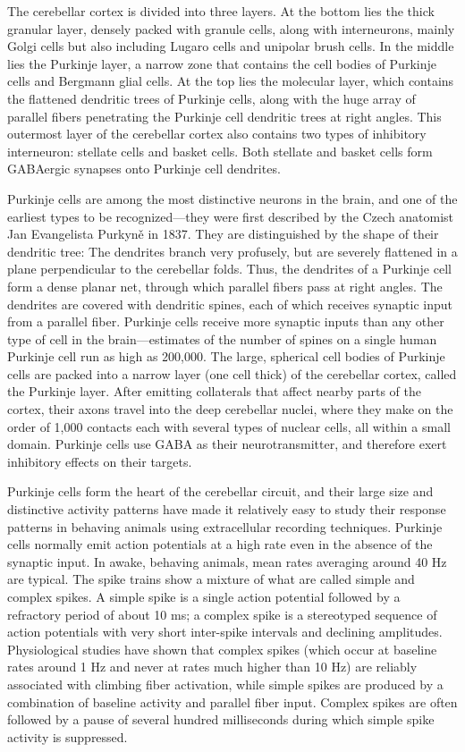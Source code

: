 The cerebellar cortex is divided into three layers. At the bottom lies the thick granular layer, densely packed with granule cells, along with interneurons, mainly Golgi cells but also including Lugaro cells and unipolar brush cells. In the middle lies the Purkinje layer, a narrow zone that contains the cell bodies of Purkinje cells and Bergmann glial cells. At the top lies the molecular layer, which contains the flattened dendritic trees of Purkinje cells, along with the huge array of parallel fibers penetrating the Purkinje cell dendritic trees at right angles. This outermost layer of the cerebellar cortex also contains two types of inhibitory interneuron: stellate cells and basket cells. Both stellate and basket cells form GABAergic synapses onto Purkinje cell dendrites.

Purkinje cells are among the most distinctive neurons in the brain, and one of the earliest types to be recognized---they were first described by the Czech anatomist Jan Evangelista Purkyně in 1837. They are distinguished by the shape of their dendritic tree: The dendrites branch very profusely, but are severely flattened in a plane perpendicular to the cerebellar folds. Thus, the dendrites of a Purkinje cell form a dense planar net, through which parallel fibers pass at right angles. The dendrites are covered with dendritic spines, each of which receives synaptic input from a parallel fiber. Purkinje cells receive more synaptic inputs than any other type of cell in the brain---estimates of the number of spines on a single human Purkinje cell run as high as 200,000. The large, spherical cell bodies of Purkinje cells are packed into a narrow layer (one cell thick) of the cerebellar cortex, called the Purkinje layer. After emitting collaterals that affect nearby parts of the cortex, their axons travel into the deep cerebellar nuclei, where they make on the order of 1,000 contacts each with several types of nuclear cells, all within a small domain. Purkinje cells use GABA as their neurotransmitter, and therefore exert inhibitory effects on their targets.

Purkinje cells form the heart of the cerebellar circuit, and their large size and distinctive activity patterns have made it relatively easy to study their response patterns in behaving animals using extracellular recording techniques. Purkinje cells normally emit action potentials at a high rate even in the absence of the synaptic input. In awake, behaving animals, mean rates averaging around 40 Hz are typical. The spike trains show a mixture of what are called simple and complex spikes. A simple spike is a single action potential followed by a refractory period of about 10 ms; a complex spike is a stereotyped sequence of action potentials with very short inter-spike intervals and declining amplitudes. Physiological studies have shown that complex spikes (which occur at baseline rates around 1 Hz and never at rates much higher than 10 Hz) are reliably associated with climbing fiber activation, while simple spikes are produced by a combination of baseline activity and parallel fiber input. Complex spikes are often followed by a pause of several hundred milliseconds during which simple spike activity is suppressed.

